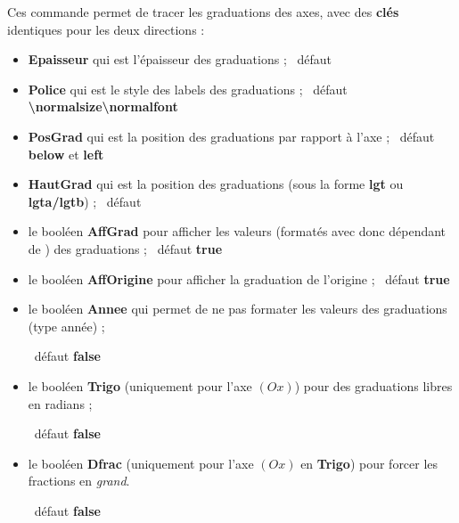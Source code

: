 \documentclass[a4paper,french,11pt]{article}
\newcommand\ctex[1]{\tcbox[vignettelatex]{#1}}
\newcommand\cmaj[1]{%
	{\tcbox[vignetteMaJ]{#1}\xspace}%
}
\newcommand\Cle[1]{{\bfseries\sffamily\textlangle #1\textrangle}}
\begin{document}

\begin{codetex}
\end{codetex}

\begin{codecles}
Ces commande permet de tracer les graduations des axes, avec des \Cle{clés} identiques pour les deux directions :

\begin{itemize}
	\item \Cle{Epaisseur} qui est l'épaisseur des graduations ; \hfill~défaut \Cle{1pt}
	\item \Cle{Police} qui est le style des labels des graduations ; \hfill~défaut \Cle{\textbackslash{}normalsize\textbackslash{}normalfont}
	\item \Cle{PosGrad} qui est la position des graduations par rapport à l'axe ; \hfill~défaut \Cle{below} et \Cle{left}
	\item \Cle{HautGrad} qui est la position des graduations (sous la forme \Cle{lgt} ou \Cle{lgta/lgtb}) ; \hfill~défaut \Cle{4pt}
	\item le booléen \Cle{AffGrad} pour afficher les valeurs (formatés avec \ctex{num} donc dépendant de \ctex{sisetup}) des graduations  ; \hfill~défaut \Cle{true}
	\item le booléen \Cle{AffOrigine} pour afficher la graduation de l'origine ; \hfill~défaut \Cle{true}
	\item le booléen \Cle{Annee} qui permet de ne pas formater les valeurs des graduations (type \textsf{année}) ;
	
	\hfill~défaut \Cle{false}
	\item \cmaj{2.5.6} le booléen \Cle{Trigo} (uniquement pour l'axe $(Ox)$) pour des graduations libres en radians ;
	
	\hfill~défaut \Cle{false}
	\item \cmaj{2.5.6} le booléen \Cle{Dfrac} (uniquement pour l'axe $(Ox)$ en \Cle{Trigo}) pour forcer les fractions en \textit{grand}.
	
	\hfill~défaut \Cle{false}
\end{itemize}
\end{codecles}

\begin{codetex}
\end{codetex}
\end{document}

